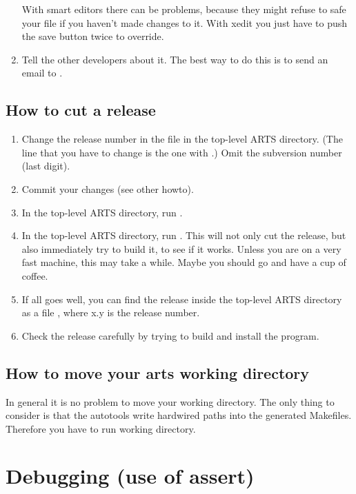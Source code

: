 \begin{enumerate}
  With smart editors there can be problems, because they might
  refuse to safe your file if you haven't made changes to it. With
  xedit you just have to push the save button twice to override.
\item Tell the other developers about it. The best way to do this is
  to send an email to .
\end{enumerate}


\subsection{How to cut a release}
\label{sec:release}
\begin{enumerate}
\item Change the release number in the file  in the
  top-level ARTS directory. (The line that you have to change is the
  one with .) Omit the subversion number (last digit).
\item Commit your changes (see other howto). 
\item In the top-level ARTS directory, run .
\item In the top-level ARTS directory, run . This
  will not only cut the release, but also immediately try to build
  it, to see if it works. Unless you are on a very fast machine, this
  may take a while. Maybe you should go and have a cup of coffee.
\item If all goes well, you can find the release inside the top-level
  ARTS directory as a file , where x.y is the
  release number.
\item Check the release carefully by trying to build and install the
  program. 
\end{enumerate}


\subsection{How to move your arts working directory}

In general it is no problem to move your working directory.
The only thing to consider is that the autotools write hardwired paths into
the generated Makefiles. Therefore you have to run 
working directory.


\section{Debugging (use of assert)}
\label{sec:development:assert}
 
